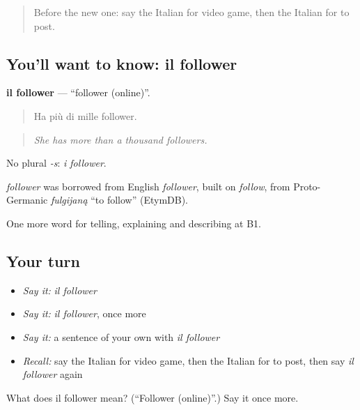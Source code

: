 \begin{quote}
Before the new one: say the Italian for video game, then the Italian for to post.
\end{quote}

\subsection*{You'll want to know: il follower}
\textbf{il follower} — \textquotedblleft{}follower (online)\textquotedblright{}.

\begin{quote}
Ha più di mille follower.
\end{quote}

\begin{quote}
\emph{She has more than a thousand followers.}
\end{quote}

No plural \emph{-s}: \emph{i follower}.

\begin{cousinweb}
\emph{follower} was borrowed from English \emph{follower}, built on \emph{follow}, from Proto-Germanic \emph{fulgijaną} \textquotedblleft{}to follow\textquotedblright{} (EtymDB).
\end{cousinweb}

\begin{grammarlens}[title={What you've built}]
One more word for telling, explaining and describing at B1.
\end{grammarlens}

\subsection*{Your turn}
\begin{itemize}
\raggedright
  \item \emph{Say it:} \emph{il follower}
  \item \emph{Say it:} \emph{il follower}, once more
  \item \emph{Say it:} a sentence of your own with \emph{il follower}
  \item \emph{Recall:} say the Italian for video game, then the Italian for to post, then say \emph{il follower} again
\end{itemize}

\begin{tcolorbox}[breakable,colback=teal!4,colframe=teal!35!black,title={Before you move on}]
What does il follower mean? (\textquotedblleft{}Follower (online)\textquotedblright{}.) Say it once more.
\end{tcolorbox}
